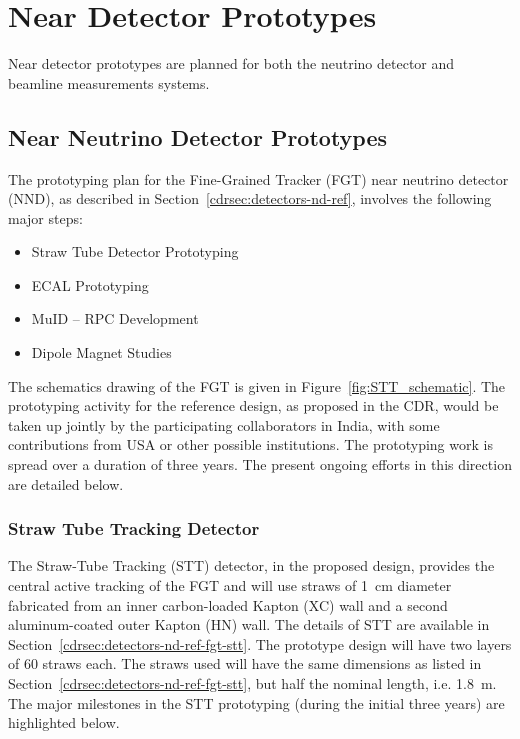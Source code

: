 
\section{Near Detector Prototypes}
\label{sec:proto-nd}
Near detector prototypes are planned for both the neutrino detector and beamline measurements systems.

\subsection{Near Neutrino Detector Prototypes}
\label{sec:proto-nd-nnd}
The prototyping plan for the Fine-Grained Tracker (FGT) near neutrino
detector (NND), as described in Section~\ref{cdrsec:detectors-nd-ref},
involves the following major steps:
\begin{itemize}
\item Straw Tube Detector Prototyping
\item ECAL Prototyping
\item MuID -- RPC Development
\item Dipole Magnet Studies
\end{itemize}

The schematics drawing of the FGT is given in
Figure~\ref{fig:STT_schematic}. The prototyping activity for the
reference design, as proposed in the CDR, would be taken up jointly by
the participating collaborators in India, with some contributions from
USA or other possible institutions.  The prototyping work is spread
over a duration of three years. The present ongoing efforts in this
direction are detailed below.

\subsubsection{Straw Tube Tracking Detector}

The Straw-Tube Tracking (STT) detector, in the proposed design,
provides the central active tracking of the FGT and will use straws of
1~cm diameter fabricated from an inner carbon-loaded Kapton (XC) wall
and a second aluminum-coated outer Kapton (HN) wall. The details of
STT are available in
Section~\ref{cdrsec:detectors-nd-ref-fgt-stt}. The prototype design
will have two layers of 60 straws each.  The straws used will have the
same dimensions as listed in
Section~\ref{cdrsec:detectors-nd-ref-fgt-stt}, but half the nominal
length, i.e. 1.8~m. The major milestones in the STT prototyping
(during the initial three years) are highlighted below.

